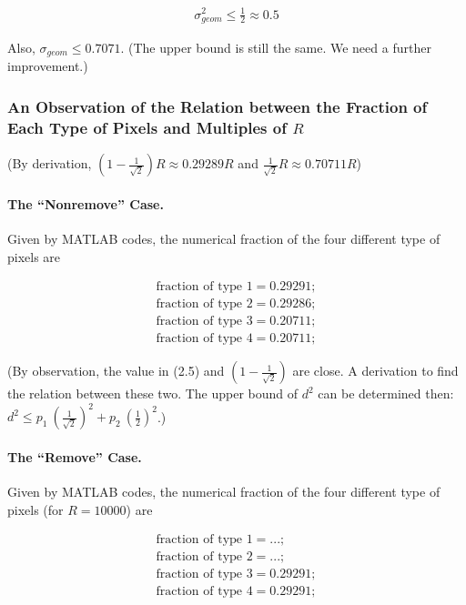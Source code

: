 \documentclass[letterpaper]{article}
\numberwithin{equation}{section} %
\numberwithin{figure}{section} %
\numberwithin{table}{section} %
\begin{document}
\begin{align} 
\sigma_{geom}^2 \leq \frac{1}{2} \approx 0.5
\end{align}

Also, $\sigma_{geom} \leq 0.7071$. (The upper bound is still the same. We need a further improvement.)

\subsubsection{An Observation of the Relation between the Fraction of Each Type of Pixels and Multiples of $R$}

(By derivation, $(1-\frac{1}{\sqrt{2}})R \approx 0.29289 R$ and $\frac{1}{\sqrt{2}}R \approx 0.70711 R$)

\paragraph{The \enquote{Nonremove} Case.}
Given by MATLAB codes, the numerical fraction of the four different type of pixels are 

\begin{align} 
\text{fraction of type 1}=0.29291; \\
\text{fraction of type 2}=0.29286; \\
\text{fraction of type 3}=0.20711; \\
\text{fraction of type 4}=0.20711; 
\end{align}

(By observation, the value in (2.5) and $(1-\frac{1}{\sqrt{2}})$ are close. A derivation to find the relation between these two. The upper bound of $d^2$ can be determined then: $d^2 \leq p_1 \ (\frac{1}{\sqrt{2}})^2 + p_2 \ (\frac{1}{2})^2 $.)

\paragraph{The \enquote{Remove} Case.}
	
Given by MATLAB codes, the numerical fraction of the four different type of pixels (for $R=10000$) are 

\begin{align} 
\text{fraction of type 1}=...; \\
\text{fraction of type 2}=...; \\
\text{fraction of type 3}=0.29291; \\
\text{fraction of type 4}=0.29291; 
\end{align}
\end{document}
